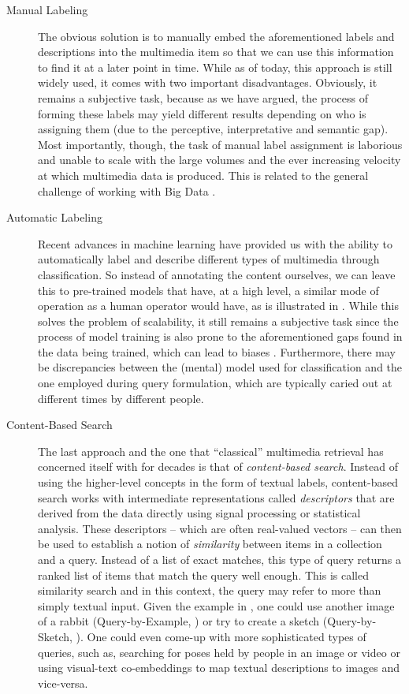\begin{description}
    \item[Manual Labeling] The obvious solution is to manually embed the aforementioned labels and descriptions into the multimedia item so that we can use this information to find it at a later point in time. While as of today, this approach is still widely used, it comes with two important disadvantages. Obviously, it remains a subjective task, because as we have argued, the process of forming these labels may yield different results depending on who is assigning them (due to the perceptive, interpretative and semantic gap). Most importantly, though, the task of manual label assignment is laborious and unable to scale with the large volumes and the ever increasing velocity at which multimedia data is produced. This is related to the general challenge of working with Big Data \cite{Khan:2014Seven}.
    \item[Automatic Labeling] Recent advances in machine learning have provided us with the ability to automatically label \cite{Redmon:2016You} and describe \cite{Radford:2021Learning} different types of multimedia through classification. So instead of annotating the content ourselves, we can leave this to pre-trained models that have, at a high level, a similar mode of operation as a human operator would have, as is illustrated in . While this solves the problem of scalability, it still remains a subjective task since the process of model training is also prone to the aforementioned gaps found in the data being trained, which can lead to biases \cite{Baer2017:Controlling}. Furthermore, there may be discrepancies between the (mental) model used for classification and the one employed during query formulation, which are typically caried out at different times by different people.
    \item[Content-Based Search] The last approach and the one that ``classical'' multimedia retrieval has concerned itself with for decades is that of \emph{content-based search}. Instead of using the higher-level concepts in the form of textual labels, content-based search works with intermediate representations called \emph{descriptors} that are derived from the data directly using signal processing or statistical analysis. These descriptors -- which are often real-valued vectors \cite{Zezula:2006Similarity} -- can then be used to establish a notion of \emph{similarity} between items in a collection and a query. Instead of a list of exact matches, this type of query returns a ranked list of items that match the query well enough. This is called similarity search \cite{Blanken:2007multimedia} and in this context, the query may refer to more than simply textual input. Given the example in , one could use another image of a rabbit (Query-by-Example, \cite{Kelly:1995Query}) or try to create a sketch (Query-by-Sketch, \cite{Sciascio:1999Content}). One could even come-up with more sophisticated types of queries, such as, searching for poses held by people in an image or video \cite{Heller:2022Multi} or using visual-text co-embeddings \cite{Radford:2021Learning,Spiess:2022Multi} to map textual descriptions to images and vice-versa.
\end{description}

